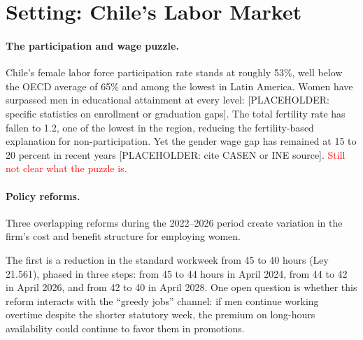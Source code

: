 \documentclass[11pt]{article}
\begin{document}
\section{Setting: Chile's Labor Market}

\paragraph{The participation and wage puzzle.} Chile's female labor force participation rate stands at roughly 53\%, well below the OECD average of 65\% and among the lowest in Latin America. Women have surpassed men in educational attainment at every level: [PLACEHOLDER: specific statistics on enrollment or graduation gaps]. The total fertility rate has fallen to 1.2, one of the lowest in the region, reducing the fertility-based explanation for non-participation. Yet the gender wage gap has remained at 15 to 20 percent in recent years [PLACEHOLDER: cite CASEN or INE source]. %
\textcolor{red}{Still not clear what the puzzle is.}
\paragraph{Policy reforms.} Three overlapping reforms during the 2022--2026 period create variation in the firm's cost and benefit structure for employing women.

The first is a reduction in the standard workweek from 45 to 40 hours (Ley 21.561), phased in three steps: from 45 to 44 hours in April 2024, from 44 to 42 in April 2026, and from 42 to 40 in April 2028. One open question is whether this reform interacts with the ``greedy jobs'' channel: if men continue working overtime despite the shorter statutory week, the premium on long-hours availability could continue to favor them in promotions.
\end{document}
